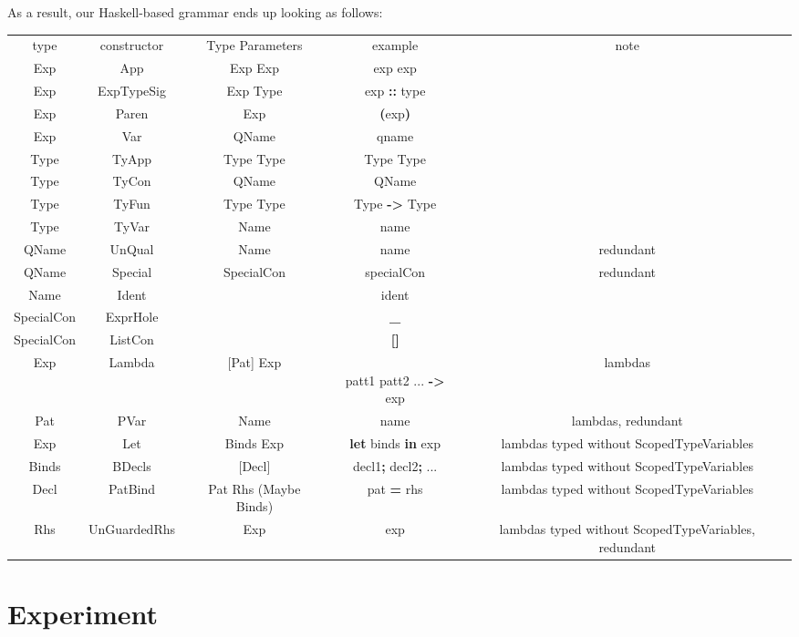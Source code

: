 \documentclass{article}
\begin{document}
As a result, our Haskell-based grammar ends up looking as follows:
\begin{tabular}{ccccc}
    type & constructor & Type Parameters & example & note \\
    Exp & App & Exp Exp & exp exp & \\
    Exp & ExpTypeSig & Exp Type & exp \textbf{::} type & \\
    Exp & Paren & Exp & \textbf{(}exp\textbf{)} & \\
    Exp & Var & QName & qname & \\
    Type & TyApp & Type Type & Type Type & \\
    Type & TyCon & QName & QName & \\
    Type & TyFun & Type Type & Type \textbf{->} Type & \\
    Type & TyVar & Name & name & \\
    QName & UnQual & Name & name & redundant \\
    QName & Special & SpecialCon & specialCon & redundant \\
    Name & Ident & & ident & \\
    SpecialCon & ExprHole & & \textbf{_} & \\
    SpecialCon & ListCon & & \textbf{[]} & \\
    Exp & Lambda & [Pat] Exp & \textbf{\\} patt1 patt2 ... \textbf{->} exp & lambdas \\
    Pat & PVar & Name & name & lambdas, redundant \\
    Exp & Let & Binds Exp & \textbf{let} binds \textbf{in} exp & lambdas typed without ScopedTypeVariables \\
    Binds & BDecls & [Decl] & decl1\textbf{;} decl2\textbf{;} ... & lambdas typed without ScopedTypeVariables \\
    Decl & PatBind & Pat Rhs (Maybe Binds) & pat \textbf{=} rhs & lambdas typed without ScopedTypeVariables \\
    Rhs & UnGuardedRhs & Exp & exp & lambdas typed without ScopedTypeVariables, redundant \\
\end{tabular}

\section{Experiment}
\end{document}
